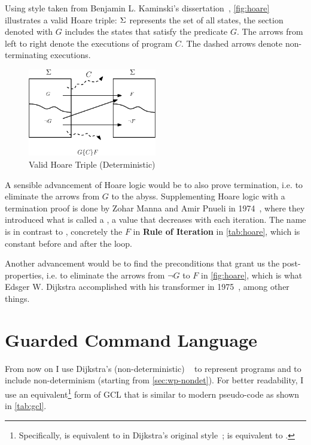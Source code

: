 Using style taken from Benjamin L. Kaminski's dissertation~\cite{kaminski19}, \autoref{fig:hoare} illustrates a valid Hoare triple: $\S$ represents the set of all states, the section denoted with $G$ includes the states that satisfy the predicate $G$. 
The arrows from left to right denote the executions of program $C$. 
The dashed arrows denote non-terminating executions. 

\begin{figure}[ht!]\centering
\includegraphics[width=0.5\textwidth]{image/hoare.eps}
\caption{Valid Hoare Triple (Deterministic)}
\label{fig:hoare}
\end{figure}


A sensible advancement of Hoare logic would be to also prove termination, i.e. to eliminate the arrows from $G$ to the abyss.  
Supplementing Hoare logic with a termination proof is done by Zohar Manna and Amir Pnueli in 1974~\cite{manna74}, where they introduced what is called a , a value that decreases with each iteration. The name is in contrast to , concretely the $F$ in \textbf{Rule of Iteration} in \autoref{tab:hoare}, which is constant before and after the loop. 

Another advancement would be to find the  preconditions that grant us the post-properties, i.e. to eliminate the arrows from $\neg G$ to $F$ in \autoref{fig:hoare}, which  is what Edsger W. Dijkstra accomplished with his  transformer in 1975~\cite{dijkstra75}, among other things. 


\section{Guarded Command Language}\label{sec:gcl}
From now on I use Dijkstra's (non-deterministic) ~\cite{dijkstra75} to represent programs and to include non-determinism (starting from \autoref{sec:wp-nondet}).
For better readability, I use an equivalent\footnote{Specifically,   is equivalent to
 in Dijkstra's original style~\cite{dijkstra75};  is equivalent to .} 
form of GCL that is similar to modern pseudo-code as shown in \autoref{tab:gcl}. 


